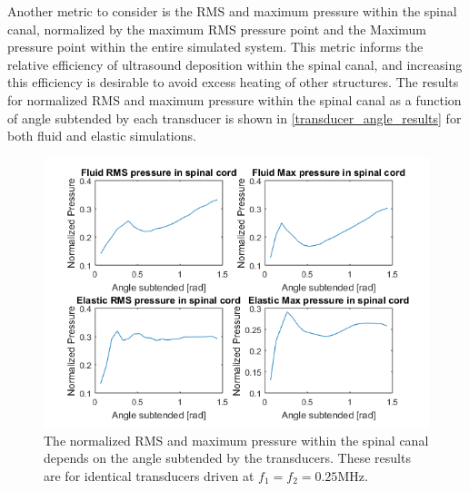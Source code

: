 \documentclass[10pt,a4paper]{article}
\begin{document}
Another metric to consider is the RMS and maximum pressure within the spinal canal, normalized by the maximum RMS pressure point and the Maximum pressure point within the entire simulated system. This metric informs the relative efficiency of ultrasound deposition within the spinal canal, and increasing this efficiency is desirable to avoid excess heating of other structures. The results for normalized RMS and maximum pressure within the spinal canal as a function of angle subtended by each transducer is shown in \autoref{transducer_angle_results} for both fluid and elastic simulations.

\begin{figure}[H]
\includegraphics[scale=0.8]{transducer_angle_results}
\caption{The normalized RMS and maximum pressure within the spinal canal depends on the angle subtended by the transducers. These results are for identical transducers driven at $f_1 = f_2 = 0.25$MHz.} \label{transducer_angle_results}
\end{figure}




\newpage
{}

\end{document}
